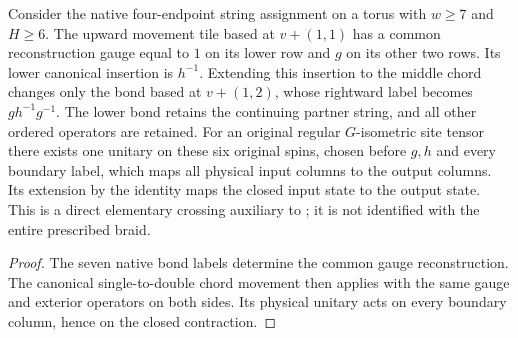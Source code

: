 \begin{lemma}
    \label{thm:peps_first_string_physical_crossing}
    \leanok
    Consider the native four-endpoint string assignment on a torus with
    $w\ge7$ and $H\ge6$. The upward movement tile based at $v+(1,1)$ has a
    common reconstruction gauge equal to $1$ on its lower row and $g$ on its
    other two rows. Its lower canonical insertion is $h^{-1}$. Extending this
    insertion to the middle chord changes only the bond based at $v+(1,2)$,
    whose rightward label becomes $gh^{-1}g^{-1}$. The lower bond retains
    the continuing partner string, and all other ordered operators are retained.
    For an original regular $G$-isometric site tensor there exists one unitary
    on these six original spins, chosen before $g,h$ and every boundary label,
    which maps all physical input columns to the output columns. Its extension
    by the identity maps the closed input state to the output state.
    This is a direct elementary crossing auxiliary to
    \cite[Theorem~6.16 and Section~6.6]{Schuch2010PEPS}; it is not identified
    with the entire prescribed braid.
\end{lemma}
\begin{proof}
    \leanok
    The seven native bond labels determine the common gauge
    reconstruction. The canonical single-to-double chord movement then applies
    with the same gauge and exterior operators on both sides. Its physical
    unitary acts on every boundary column, hence on the closed contraction.
\end{proof}
